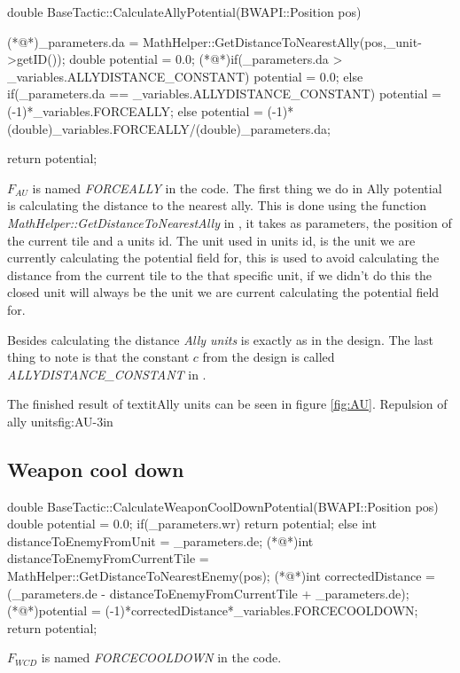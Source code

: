 {	
		\begin{Sourcecode}[caption=Ally units]
double BaseTactic::CalculateAllyPotential(BWAPI::Position pos)
{
	(*@\lnote@*)_parameters.da = MathHelper::GetDistanceToNearestAlly(pos,_unit->getID());
	double potential = 0.0;
	(*@\lnote@*)if(_parameters.da > _variables.ALLYDISTANCE_CONSTANT)
		potential = 0.0;
	else if(_parameters.da == _variables.ALLYDISTANCE_CONSTANT)
		potential = (-1)*_variables.FORCEALLY;
	else
		potential = (-1)*(double)_variables.FORCEALLY/(double)_parameters.da;
	
	return potential;
}
\end{Sourcecode}	
	$F_{AU}$ is named \textit{FORCEALLY} in the code. 
	The first thing we do in Ally potential is calculating the distance to the nearest ally. This is done using the function \textit{MathHelper::GetDistanceToNearestAlly} in , it takes as parameters, the position of the current tile and a units id. The unit used in units id, is the unit we are currently calculating the potential field for, this is used to avoid calculating the distance from the current tile to the that specific unit, if we didn't do this the closed unit will always be the unit we are current calculating the potential field for.
	
	Besides calculating the distance \textit{Ally units} is exactly as in the design. The last thing to note is that the constant $c$ from the design is called \textit{ALLYDISTANCE\_CONSTANT} in .
	
	The finished result of textit{Ally units} can be seen in figure \ref{fig:AU}.
			{Repulsion of ally units}{fig:AU}{-3in}
	
	\subsection{Weapon cool down}
		\begin{Sourcecode}[caption=Weapon cool down]
double BaseTactic::CalculateWeaponCoolDownPotential(BWAPI::Position pos)
{
	double potential = 0.0;
	if(_parameters.wr)
		return potential;
	else
	{
		int distanceToEnemyFromUnit = _parameters.de;
		(*@\lnote@*)int distanceToEnemyFromCurrentTile = MathHelper::GetDistanceToNearestEnemy(pos);
		(*@\lnote@*)int correctedDistance = (_parameters.de - distanceToEnemyFromCurrentTile + _parameters.de);
		(*@\lnote@*)potential = (-1)*correctedDistance*_variables.FORCECOOLDOWN;
		return potential;
	}
}
\end{Sourcecode}		
	$F_{WCD}$ is named \textit{FORCECOOLDOWN} in the code. 
	
}
